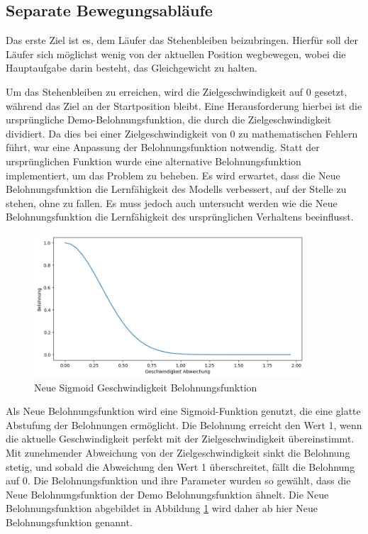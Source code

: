 \subsection{Separate Bewegungsabläufe}

Das erste Ziel ist es, dem Läufer das Stehenbleiben beizubringen. Hierfür soll der Läufer sich möglichst wenig von der aktuellen Position wegbewegen, wobei die Hauptaufgabe darin besteht, das Gleichgewicht zu halten.

Um das Stehenbleiben zu erreichen, wird die Zielgeschwindigkeit auf 0 gesetzt, während das Ziel an der Startposition bleibt. Eine Herausforderung hierbei ist die ursprüngliche Demo-Belohnungsfunktion, die durch die Zielgeschwindigkeit dividiert. Da dies bei einer Zielgeschwindigkeit von 0 zu mathematischen Fehlern führt, war eine Anpassung der Belohnungsfunktion notwendig. Statt der ursprünglichen Funktion wurde eine alternative Belohnungsfunktion implementiert, um das Problem zu beheben. Es wird erwartet, dass die Neue Belohnungsfunktion die Lernfähigkeit des Modells verbessert, auf der Stelle zu stehen, ohne zu fallen. Es muss jedoch auch untersucht werden wie die Neue Belohnungsfunktion die Lernfähigkeit des ursprünglichen Verhaltens beeinflusst.

\begin{figure}[H]
  \centering  
  \includegraphics[width=0.9\textwidth]{img/plot_vel_reward_neu}
  \caption{Neue Sigmoid Geschwindigkeit Belohnungsfunktion}
  \label{fig:plot_vel_reward_neu}
\end{figure}

Als Neue Belohnungsfunktion wird eine Sigmoid-Funktion genutzt, die eine glatte Abstufung der Belohnungen ermöglicht. Die Belohnung erreicht den Wert 1, wenn die aktuelle Geschwindigkeit perfekt mit der Zielgeschwindigkeit übereinstimmt. Mit zunehmender Abweichung von der Zielgeschwindigkeit sinkt die Belohnung stetig, und sobald die Abweichung den Wert 1 überschreitet, fällt die Belohnung auf 0. Die Belohnungsfunktion und ihre Parameter wurden so gewählt, dass die Neue Belohnungsfunktion der Demo Belohnungsfunktion ähnelt. Die Neue Belohnungsfunktion abgebildet in Abbildung \ref{fig:plot_vel_reward_neu} wird daher ab hier Neue Belohnungsfunktion genannt.

